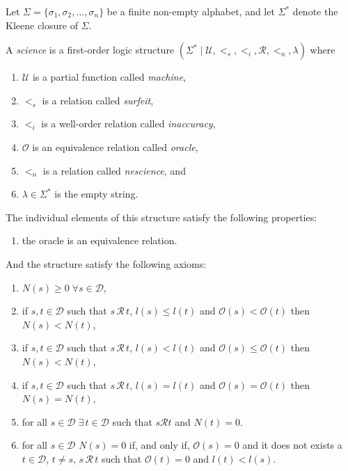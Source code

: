 Let $\Sigma = \{ \sigma_1, \sigma_2, \ldots, \sigma_n \}$ be a finite non-empty alphabet, and let $\Sigma^\ast$ denote the Kleene closure of $\Sigma$.


A \emph{science} is a first-order logic structure $(\Sigma^\ast \mid \mathcal{U}, <_s, <_i, \mathcal{R}, <_n, \lambda)$ where

\begin{enumerate}[label=(\roman*)]
\item $\mathcal{U}$ is a partial function called \emph{machine},
\item $<_s$ is a relation called \emph{surfeit},
\item $<_i$ is a well-order relation called \emph{inaccuracy},
\item $\mathcal{O}$ is an equivalence relation called \emph{oracle},
\item $<_n$ is a relation called \emph{nescience}, and
\item $\lambda \in \Sigma^\ast$ is the empty string.
\end{enumerate}

\smallskip

The individual elements of this structure satisfy the following properties:

\begin{enumerate}[label=(\roman*)]
\item the oracle is an equivalence relation.
\end{enumerate}

And the structure satisfy the following axioms:

\smallskip

\begin{enumerate}[label=(\roman*)]

\item $N(s) \geq 0 \; \forall s \in \mathcal{D}$,

\item if $s, t \in \mathcal{D}$ such that $s \, \mathcal{R} \, t$, $l(s) \leq l(t)$ and $\mathcal{O} (s) < \mathcal{O} (t)$ then $N(s) < N(t)$,

\item if $s, t \in \mathcal{D}$ such that $s \, \mathcal{R} \, t$, $l(s) < l(t)$ and $\mathcal{O} (s) \leq \mathcal{O} (t)$ then $N(s) < N(t)$,

\item if $s, t \in \mathcal{D}$ such that $s \, \mathcal{R} \, t$, $l(s) = l(t)$ and $\mathcal{O} (s) = \mathcal{O} (t)$ then $N(s) = N(t)$,

\item for all $s \in \mathcal{D} \; \exists \, t \in \mathcal{D}$ such that $s \mathcal{R} t$ and $N(t) = 0$.

\item for all $s \in \mathcal{D}$ $N(s) = 0$  if, and only if, $\mathcal{O} (s) = 0$
and it does not exists a $t \in \mathcal{D}$, $t \neq s$, $s \, \mathcal{R} \, t$  such that $\mathcal{O} (t) = 0$ and $l(t) < l(s)$.

\end{enumerate}

